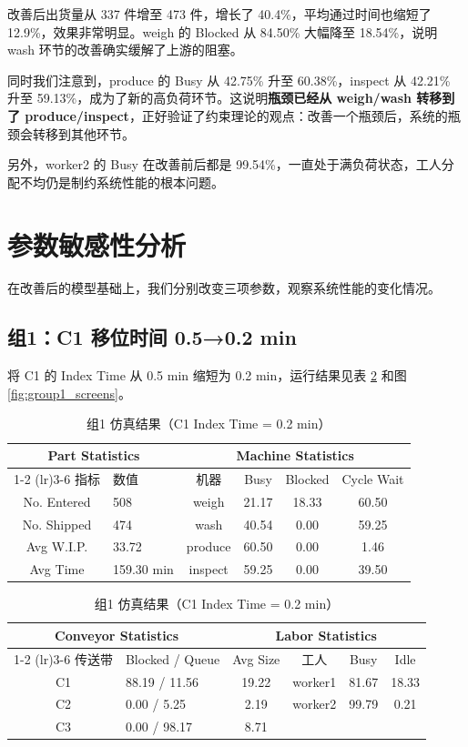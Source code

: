 \documentclass[12pt, a4paper, UTF8]{ctexart}
\begin{document}
改善后出货量从 337 件增至 473 件，增长了 40.4\%，平均通过时间也缩短了 12.9\%，效果非常明显。weigh 的 Blocked 从 84.50\% 大幅降至 18.54\%，说明 wash 环节的改善确实缓解了上游的阻塞。

同时我们注意到，produce 的 Busy 从 42.75\% 升至 60.38\%，inspect 从 42.21\% 升至 59.13\%，成为了新的高负荷环节。这说明\textbf{瓶颈已经从 weigh/wash 转移到了 produce/inspect}，正好验证了约束理论的观点：改善一个瓶颈后，系统的瓶颈会转移到其他环节。

另外，worker2 的 Busy 在改善前后都是 99.54\%，一直处于满负荷状态，工人分配不均仍是制约系统性能的根本问题。

\section{参数敏感性分析}
在改善后的模型基础上，我们分别改变三项参数，观察系统性能的变化情况。

\subsection{组1：C1 移位时间 0.5→0.2 min}
将 C1 的 Index Time 从 0.5 min 缩短为 0.2 min，运行结果见表 \ref{tab:group1} 和图 \ref{fig:group1_screens}。

\begin{table}[H]
    \centering
    \caption{组1 仿真结果（C1 Index Time = 0.2 min）}
    \label{tab:group1}
    \small
    \begin{tabular}{clcccc}
        \toprule
        \multicolumn{2}{c}{\textbf{Part Statistics}} & \multicolumn{4}{c}{\textbf{Machine Statistics}} \\
        \cmidrule(lr){1-2} \cmidrule(lr){3-6}
        指标 & 数值 & 机器 & Busy & Blocked & Cycle Wait \\
        \midrule
        No. Entered & 508 & weigh & 21.17 & 18.33 & 60.50 \\
        No. Shipped & 474 & wash & 40.54 & 0.00 & 59.25 \\
        Avg W.I.P. & 33.72 & produce & 60.50 & 0.00 & 1.46 \\
        Avg Time & 159.30 min & inspect & 59.25 & 0.00 & 39.50 \\
        \bottomrule
    \end{tabular}

    \vspace{6pt}
    \small
    \begin{tabular}{clcccc}
        \toprule
        \multicolumn{2}{c}{\textbf{Conveyor Statistics}} & \multicolumn{4}{c}{\textbf{Labor Statistics}} \\
        \cmidrule(lr){1-2} \cmidrule(lr){3-6}
        传送带 & Blocked / Queue & Avg Size & 工人 & Busy & Idle \\
        \midrule
        C1 & 88.19 / 11.56 & 19.22 & worker1 & 81.67 & 18.33 \\
        C2 & 0.00 / 5.25 & 2.19 & worker2 & 99.79 & 0.21 \\
        C3 & 0.00 / 98.17 & 8.71 & & & \\
        \bottomrule
    \end{tabular}
\end{table}
\end{document}
